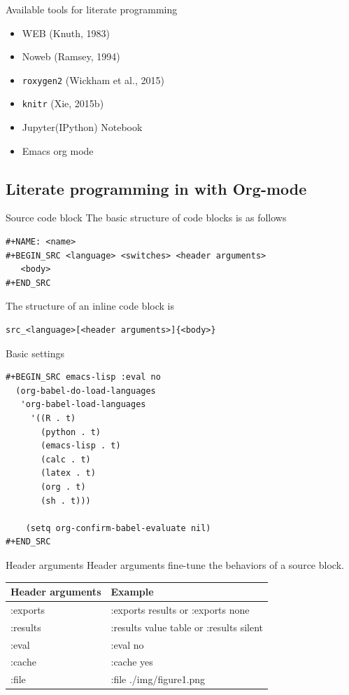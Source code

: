 \documentclass[presentation]{beamer}
\begin{document}
\begin{frame}[fragile,label={sec:orga9239e6}]{Available tools for literate programming}
 \begin{itemize}
\item WEB (Knuth, 1983)
\item Noweb (Ramsey, 1994)
\item \texttt{roxygen2} (Wickham et al., 2015)
\item \texttt{knitr} (Xie, 2015b)
\item Jupyter(IPython) Notebook
\item Emacs org mode
\end{itemize}
\end{frame}


\subsection*{Literate programming in with Org-mode}
\label{sec:orgd40efab}

\begin{frame}[fragile,label={sec:orgb6904d5}]{Source code block}
 The basic structure of code blocks is as follows

\begin{verbatim}
#+NAME: <name>
#+BEGIN_SRC <language> <switches> <header arguments>
   <body>
#+END_SRC
\end{verbatim}

The structure of an inline code block is

\begin{verbatim}
src_<language>[<header arguments>]{<body>}
\end{verbatim}
\end{frame}

\begin{frame}[fragile,label={sec:org807e1c8}]{Basic settings}
 \begin{verbatim}
#+BEGIN_SRC emacs-lisp :eval no
  (org-babel-do-load-languages
   'org-babel-load-languages
     '((R . t)
       (python . t)
       (emacs-lisp . t)
       (calc . t)
       (latex . t)
       (org . t)
       (sh . t)))

    (setq org-confirm-babel-evaluate nil)
#+END_SRC
\end{verbatim}
\end{frame}

\begin{frame}[label={sec:org634bbee}]{Header arguments}
Header arguments fine-tune the behaviors of a source block.

\begin{center}
\begin{tabular}{ll}
Header arguments & Example\\
\hline
:exports & :exports results or :exports none\\
:results & :results value table or :results silent\\
:eval & :eval no\\
:cache & :cache yes\\
:file & :file ./img/figure1.png\\
\end{tabular}
\end{center}
\end{frame}
\end{document}
